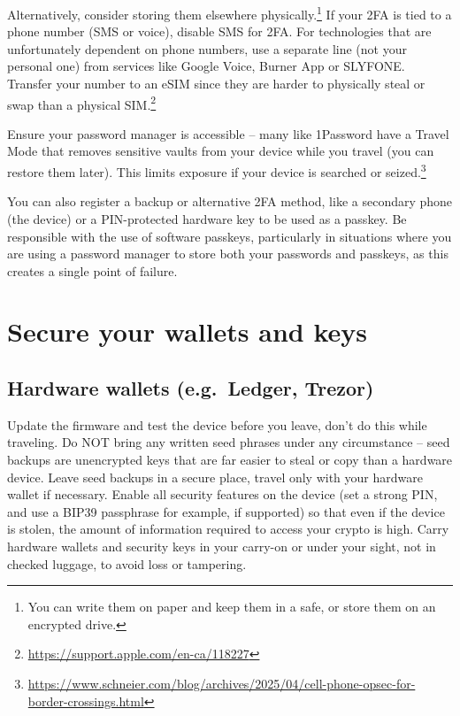 Alternatively, consider storing them elsewhere
physically.\footnote{You can write them on paper and keep
them in a safe, or store them on an encrypted drive.} If
your 2FA is tied to a phone number (SMS or voice), disable
SMS for 2FA. For technologies that are unfortunately
dependent on phone numbers, use a separate line (not your
personal one) from services like Google Voice, Burner App
or SLYFONE. Transfer your number to an eSIM since they are
harder to physically steal or swap than a physical
SIM.\footnote{\url{https://support.apple.com/en-ca/118227}}

Ensure your password manager is accessible -- many like
1Password have a Travel Mode that removes sensitive vaults
from your device while you travel (you can restore them
later). This limits exposure if your device is searched or
seized.\footnote{\url{https://www.schneier.com/blog/archives/2025/04/cell-phone-opsec-for-border-crossings.html}}

You can also register a backup or alternative 2FA method,
like a secondary phone (the device) or a PIN-protected
hardware key to be used as a passkey. Be responsible with
the use of software passkeys, particularly in situations
where you are using a password manager to store both your
passwords and passkeys, as this creates a single point of
failure.

\section{Secure your wallets and keys}

\subsection{Hardware wallets (e.g.\ Ledger, Trezor)}

Update the firmware and test the device before you leave,
don't do this while traveling. Do NOT bring any written
seed phrases under any circumstance -- seed backups are
unencrypted keys that are far easier to steal or copy than
a hardware device. Leave seed backups in a secure place,
travel only with your hardware wallet if necessary. Enable
all security features on the device (set a strong PIN, and
use a BIP39 passphrase for example, if supported) so that
even if the device is stolen, the amount of information
required to access your crypto is high. Carry hardware
wallets and security keys in your carry-on or under your
sight, not in checked luggage, to avoid loss or tampering.

